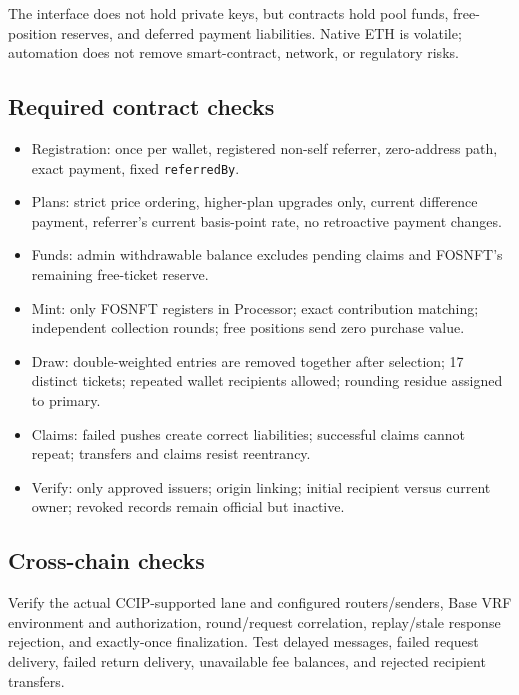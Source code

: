 \documentclass[
  10pt,
  letterpaper,
]{article}
\providecommand{\tightlist}{%
  \setlength{\itemsep}{0pt}\setlength{\parskip}{0pt}}
\begin{document}
The interface does not hold private keys, but contracts hold pool funds,
free-position reserves, and deferred payment liabilities. Native ETH is
volatile; automation does not remove smart-contract, network, or
regulatory risks.

\subsection{Required contract checks}\label{required-contract-checks}

\begin{itemize}
\tightlist
\item
  Registration: once per wallet, registered non-self referrer,
  zero-address path, exact payment, fixed \texttt{referredBy}.
\item
  Plans: strict price ordering, higher-plan upgrades only, current
  difference payment, referrer's current basis-point rate, no
  retroactive payment changes.
\item
  Funds: admin withdrawable balance excludes pending claims and FOSNFT's
  remaining free-ticket reserve.
\item
  Mint: only FOSNFT registers in Processor; exact contribution matching;
  independent collection rounds; free positions send zero purchase
  value.
\item
  Draw: double-weighted entries are removed together after selection; 17
  distinct tickets; repeated wallet recipients allowed; rounding residue
  assigned to primary.
\item
  Claims: failed pushes create correct liabilities; successful claims
  cannot repeat; transfers and claims resist reentrancy.
\item
  Verify: only approved issuers; origin linking; initial recipient
  versus current owner; revoked records remain official but inactive.
\end{itemize}

\subsection{Cross-chain checks}\label{cross-chain-checks}

Verify the actual CCIP-supported lane and configured routers/senders,
Base VRF environment and authorization, round/request correlation,
replay/stale response rejection, and exactly-once finalization. Test
delayed messages, failed request delivery, failed return delivery,
unavailable fee balances, and rejected recipient transfers.
\end{document}
